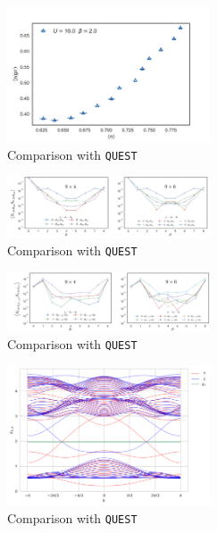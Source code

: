 \begin{figure}[H]
  \centering
  \includegraphics[width=6cm]{images/signTMDdensSignU16beta2.png}
  \caption{Comparison with \texttt{QUEST}}
  \label{fig:blade_flow_pressure}
\end{figure}

\begin{figure}[H]
  \centering
  \includegraphics[width=6cm]{images/tmdFinalxyxy.png}
  \caption{Comparison with \texttt{QUEST}}
  \label{fig:blade_flow_pressure}
\end{figure}

\begin{figure}[H]
  \centering
  \includegraphics[width=6cm]{images/tmdFinalx2y2z2.png}
  \caption{Comparison with \texttt{QUEST}}
  \label{fig:blade_flow_pressure}
\end{figure}

\begin{figure}[H]
  \centering
  \includegraphics[width=6cm]{images/bands_Nx=512.png}
  \caption{Comparison with \texttt{QUEST}}
  \label{fig:blade_flow_pressure}
\end{figure}



